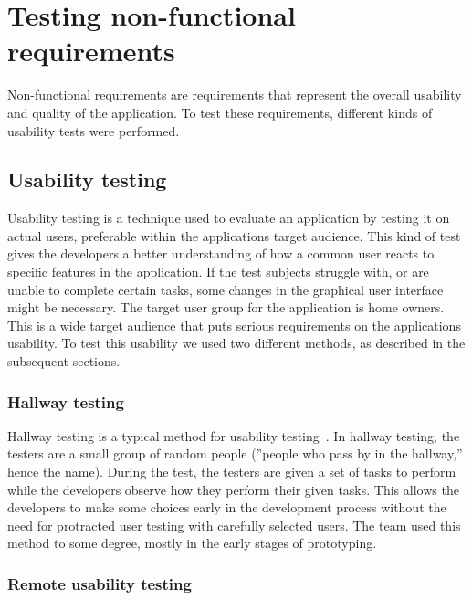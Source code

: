 \section{Testing non-functional requirements}
\label{sec:testingnonfunctionalrequirements}
Non-functional requirements are requirements that represent the overall usability and quality of the application. To test these requirements, different kinds of usability tests were performed.

\subsection{Usability testing}
\label{sec:userTest}
Usability testing is a technique used to evaluate an application by testing it on actual users, preferable within the applications target audience. This kind of test gives the developers a better understanding of how a common user reacts to specific features in the application. If the test subjects struggle with, or are unable to complete certain tasks, some changes in the graphical user interface might be necessary.
The target user group for the application is home owners. This is a wide target audience that puts serious requirements on the applications usability. To test this usability we used two different methods, as described in the subsequent sections.

\subsubsection{Hallway testing}
Hallway testing is a typical method for usability testing~\cite{hallwaytesting}. In hallway testing, the testers are a small group of random people (''people who pass by in the hallway,'' hence the name). During the test, the testers are given a set of tasks to perform while the developers observe how they perform their given tasks. This allows the developers to make some choices early in the development process without the need for protracted user testing with carefully selected users. 
The team used this method to some degree, mostly in the early stages of prototyping.

\subsubsection{Remote usability testing}

